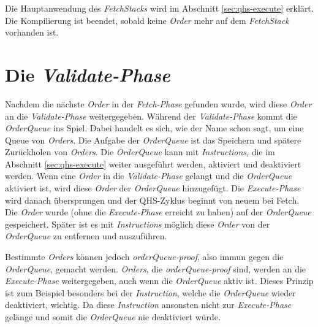 
%
%
Die Hauptanwendung des \textit{FetchStacks} wird im Abschnitt \ref{sec:qhs-execute} erklärt.
Die Kompilierung ist beendet, sobald keine \textit{Order} mehr auf dem \textit{FetchStack} vorhanden ist.

\section{Die \textit{Validate-Phase}} \label{sec:qhs-Validate}
Nachdem die nächste \textit{Order} in der  \textit{Fetch-Phase} gefunden wurde, wird diese \textit{Order} an die \textit{Validate-Phase} weitergegeben. Während der \textit{Validate-Phase} kommt die \textit{OrderQueue} ins Spiel.
Dabei handelt es sich, wie der Name schon sagt, um eine Queue von \textit{Orders}.
Die Aufgabe der \textit{OrderQueue} ist das Speichern und spätere Zurückholen von \textit{Orders}.
Die \textit{OrderQueue} kann mit \textit{Instructions}, die im Abschnitt \ref{sec:qhs-execute} weiter ausgeführt werden, aktiviert und deaktiviert werden.
Wenn eine \textit{Order} in die \textit{Validate-Phase} gelangt und die \textit{OrderQueue} aktiviert ist, wird diese \textit{Order} der \textit{OrderQueue} hinzugefügt.
Die \textit{Execute-Phase} wird danach übersprungen und der QHS-Zyklus beginnt von neuem bei Fetch.
Die \textit{Order} wurde (ohne die \textit{Execute-Phase} erreicht zu haben) auf der \textit{OrderQueue} gespeichert.
Später ist es mit \textit{Instructions} möglich diese \textit{Order} von der \textit{OrderQueue} zu entfernen und auszuführen.

Bestimmte \textit{Orders} können jedoch \textit{orderQueue-proof}, also immun gegen die \textit{OrderQueue}, gemacht werden.
\textit{Orders}, die \textit{orderQueue-proof} sind, werden an die \textit{Execute-Phase} weitergegeben, auch wenn die \textit{OrderQueue} aktiv ist.
Dieses Prinzip ist zum Beispiel besonders bei der \textit{Instruction}, welche die \textit{OrderQueue} wieder deaktiviert, wichtig.
Da diese \textit{Instruction} ansonsten nicht zur \textit{Execute-Phase} gelänge und somit die \textit{OrderQueue} nie deaktiviert würde.

